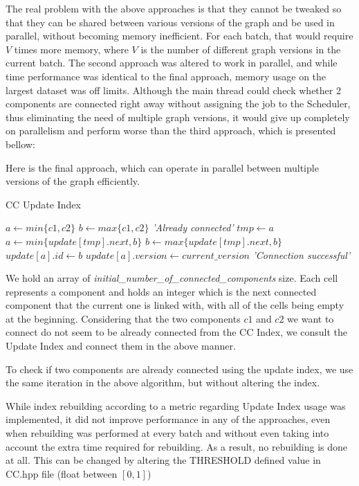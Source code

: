 \documentclass[11pt]{article}
\begin{document}
The real problem with the above approaches is that they cannot be tweaked so that they can be shared between various versions of the graph and be used in parallel,
without becoming memory inefficient. For each batch, that would require $V$ times more memory, where $V$ is the number of different graph versions in the current batch.
The second approach was altered to work in parallel, and while time performance was identical to the final approach, memory usage on the largest dataset was off limits.
Although the main thread could check whether 2 components are connected right away without assigning the job to the Scheduler, thus eliminating the need of multiple graph versions,
it would give up completely on parallelism and perform worse than the third approach, which is presented bellow:

Here is the final approach, which can operate in parallel between multiple versions of the graph efficiently.

\begin{algorithm}
\caption{CC Update Index}\label{euclid}
\begin{algorithmic}[1]
\State $a \gets min\{c1, c2\}$
\State $b \gets max\{c1, c2\}$
		\State \Return \textit{'Already connected'}
	\EndIf
	\State $tmp \gets a$
	\State $a \gets min\{update[tmp].next, b\}$
	\State $b \gets max\{update[tmp].next, b\}$
\EndWhile
\State $update[a].id \gets b$
\State $update[a].version \gets current\_version$
\State \Return \textit{'Connection successful'}
\EndProcedure
\end{algorithmic}
\end{algorithm}

We hold an array of \textit{initial\_number\_of\_connected\_components} size. Each cell represents a component and
holds an integer which is the next connected component that the current one is linked with, with all of the cells being empty at the beginning. 
Considering that the two components $c1$ and $c2$ we want to connect do not seem to be already 
connected from the CC Index, we consult the Update Index and connect them in the above manner.

To check if two components are already connected using the update index, we use the same iteration in the above algorithm, but without altering the index.

While index rebuilding according to a metric regarding Update Index usage was implemented, it did not improve performance in any of the approaches,
even when rebuilding was performed at every batch and without even taking into account the extra time required for rebuilding.
As a result, no rebuilding is done at all. This can be changed by altering the THRESHOLD defined value in CC.hpp file (float between $[0,1]$)
\end{document}
